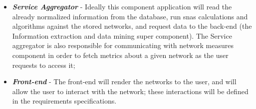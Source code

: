 \begin{itemize}
    \item \textbf{\textit{Service Aggregator}} - Ideally this component application will read the already normalized information from the database, run \glspl{sna} calculations and algorithms against the stored networks, and request data to the back-end (the Information extraction and data mining super component). The Service aggregator is also responsible for communicating with network measures component in order to fetch metrics about a given network as the user requests to access it;
    \item \textbf{\textit{Front-end}} - The front-end will render the networks to the user, and will allow the user to interact with the network; these interactions will be defined in the requirements specifications.
\end{itemize}
